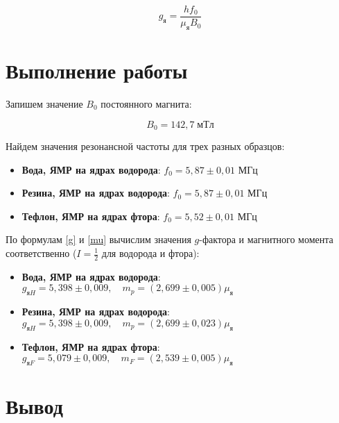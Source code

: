 \documentclass[12pt]{kiarticle}
\begin{document}
	\begin{equation}\label{g}
	g_{я} = \dfrac{hf_0}{\mu_я B_0} 
	\end{equation}

	
	\section{Выполнение работы}
	
	Запишем значение $ B_0 $ постоянного магнита:
	
	\begin{equation}\label{}
	B_0 = 142,7 \; мТл
	\end{equation} 
	
	Найдем значения резонансной частоты для трех разных образцов:
	
	\begin{itemize}
		\item \textbf{Вода, ЯМР на ядрах водорода}: $ f_0 = 5,87 \pm 0,01 $ МГц
			
		\item \textbf{Резина, ЯМР на ядрах водорода}: $ f_0 = 5,87 \pm 0,01 $ МГц
			
		\item \textbf{Тефлон, ЯМР на ядрах фтора}: $ f_0 = 5,52 \pm 0,01 $ МГц
	\end{itemize}
	
	По формулам \eqref{g} и \eqref{mu} вычислим значения $ g $-фактора и магнитного момента соответственно ($ I = \frac{1}{2} $ для водорода и фтора): 
	
	\begin{itemize}
		\item \textbf{Вода, ЯМР на ядрах водорода}: $ g_{яH} = 5,398 \pm 0,009, \quad m_p  = (2,699 \pm 0,005)\mu_я $ 
		
		\item \textbf{Резина, ЯМР на ядрах водорода}: $ g_{яH} = 5,398 \pm 0,009, \quad m_p   = (2,699 \pm 0,023)\mu_я  $ 
		
		\item \textbf{Тефлон, ЯМР на ядрах фтора}: $ g_{яF} = 5,079 \pm 0,009, \quad m_F  = (2,539 \pm 0,005)\mu_я  $ 
	\end{itemize}
	
	\section{Вывод}
	
\end{document}
